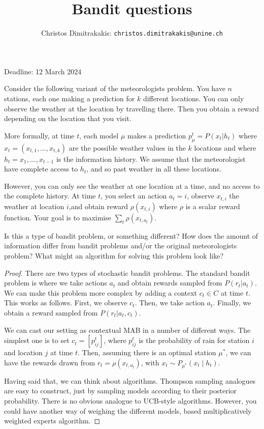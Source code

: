 \documentclass[twoside,a4paper]{article}
\begin{document}
\title{Bandit questions}

\author{Christos Dimitrakakis: \texttt{christos.dimitrakakis@unine.ch}}

\maketitle
\large{Deadline: 12 March 2024}


\vspace{1em}

\begin{exercise}
  Consider the following variant of the meteorologists problem.  You
  have $n$ stations, each one making a prediction for $k$ different
  locations. You can only observe the weather at the location by
  travelling there. Then you obtain a reward depending on the location
  that you visit.

  More formally, at time $t$, each model $\mu$ makes a prediction
  $p^t_{\mu} = P(x_{t} | h_t)$ where $x_{t} = (x_{t,1}, \ldots, x_{t,k})$ are the
  possible weather values in the $k$ locations and where
  $h_t = x_1, \ldots, x_{t-1}$ is the information history. We assume
  that the meteorologist have complete access to $h_t$, and so past
  weather in all these locations.

  However, you can only see the weather at one location at a time, and
  no access to the complete history. At time $t$, you select an action
  $a_t = i$, observe $x_{t,i}$ the weather at location $i$,and obtain
  reward $\rho(x_{t,i})$ where $\rho$ is a scalar reward
  function. Your goal is to maximise $\sum_t \rho(x_{t,a_t})$.

  Is this a type of bandit problem, or something different? How does
  the amount of information differ from bandit problems and/or the
  original meteorologists problem? What might an algorithm for solving
  this problem look like?
\end{exercise}
\begin{proof}
  There are two types of stochastic bandit problems. The standard
  bandit problem is where we take actions $a_t$ and obtain rewards
  sampled from $P(r_t | a_t)$. We can make this problem more complex
  by adding a context $c_t \in C$ at time $t$. This works as follows.
  First, we observe $c_t$. Then, we take action $a_t$. Finally, we
  obtain a reward sampled from $P(r_t | a_t, c_t)$.

  We can cast our setting as contextual MAB in a number of different ways. The simplest one is to set $c_t = [p^t_{ij}]$, where $p^t_{ij}$ is the probability of rain for station $i$ and location $j$ at time $t$. Then, assuming there is an optimal station $\mu^*$, we can have the rewards drawn from $r_t = \rho(x_{t,a_t})$, with $x_t \sim P_{\mu^*}(x_t \mid h_t)$.

  Having said that, we can think about algorithms. Thompson sampling analogues are easy to construct, just by sampling models according to their posterior probability. There is no obvious analogue to UCB-style algorithms. However, you could have another way of weighing the different models, based multiplicatively weighted experts algorithm.
\end{proof}
\end{document}
